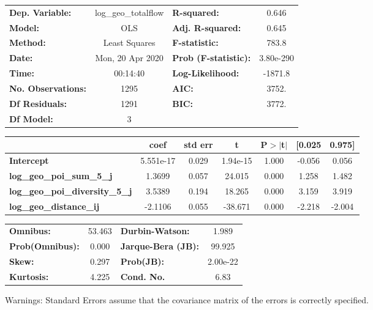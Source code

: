 \begin{center}
\begin{tabular}{lclc}
\toprule
\textbf{Dep. Variable:}                 & log\_geo\_totalflow & \textbf{  R-squared:         } &     0.646   \\
\textbf{Model:}                         &         OLS         & \textbf{  Adj. R-squared:    } &     0.645   \\
\textbf{Method:}                        &    Least Squares    & \textbf{  F-statistic:       } &     783.8   \\
\textbf{Date:}                          &   Mon, 20 Apr 2020  & \textbf{  Prob (F-statistic):} & 3.80e-290   \\
\textbf{Time:}                          &       00:14:40      & \textbf{  Log-Likelihood:    } &   -1871.8   \\
\textbf{No. Observations:}              &          1295       & \textbf{  AIC:               } &     3752.   \\
\textbf{Df Residuals:}                  &          1291       & \textbf{  BIC:               } &     3772.   \\
\textbf{Df Model:}                      &             3       & \textbf{                     } &             \\
\bottomrule
\end{tabular}
\begin{tabular}{lcccccc}
                                        & \textbf{coef} & \textbf{std err} & \textbf{t} & \textbf{P$> |$t$|$} & \textbf{[0.025} & \textbf{0.975]}  \\
\midrule
\textbf{Intercept}                      &    5.551e-17  &        0.029     &  1.94e-15  &         1.000        &       -0.056    &        0.056     \\
\textbf{log\_geo\_poi\_sum\_5\_j}       &       1.3699  &        0.057     &    24.015  &         0.000        &        1.258    &        1.482     \\
\textbf{log\_geo\_poi\_diversity\_5\_j} &       3.5389  &        0.194     &    18.265  &         0.000        &        3.159    &        3.919     \\
\textbf{log\_geo\_distance\_ij}         &      -2.1106  &        0.055     &   -38.671  &         0.000        &       -2.218    &       -2.004     \\
\bottomrule
\end{tabular}
\begin{tabular}{lclc}
\textbf{Omnibus:}       & 53.463 & \textbf{  Durbin-Watson:     } &    1.989  \\
\textbf{Prob(Omnibus):} &  0.000 & \textbf{  Jarque-Bera (JB):  } &   99.925  \\
\textbf{Skew:}          &  0.297 & \textbf{  Prob(JB):          } & 2.00e-22  \\
\textbf{Kurtosis:}      &  4.225 & \textbf{  Cond. No.          } &     6.83  \\
\bottomrule
\end{tabular}
\end{center}

Warnings: \newline
 [1] Standard Errors assume that the covariance matrix of the errors is correctly specified.
